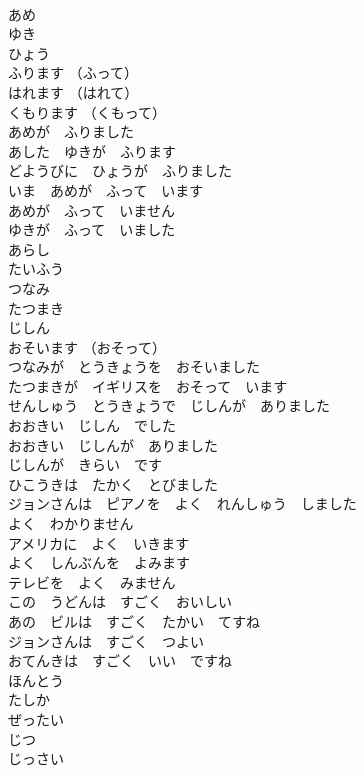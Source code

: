 \documentclass[8pt]{extreport}
\begin{document}
\begin{CJK}{UTF8}{min}
\\	あめ	
\\	ゆき	
\\	ひょう	
\\	ふります （ふって）	
\\	はれます （はれて）	
\\	くもります （くもって）	
\\	あめが　ふりました	
\\	あした　ゆきが　ふります	
\\	どようびに　ひょうが　ふりました	
\\	いま　あめが　ふって　います	
\\	あめが　ふって　いません	
\\	ゆきが　ふって　いました	
\\	あらし	
\\	たいふう	
\\	つなみ	
\\	たつまき	
\\	じしん	
\\	おそいます （おそって）	
\\	つなみが　とうきょうを　おそいました	
\\	たつまきが　イギリスを　おそって　います	
\\	せんしゅう　とうきょうで　じしんが　ありました	
\\	おおきい　じしん　でした	
\\	おおきい　じしんが　ありました	
\\	じしんが　きらい　です	
\\	ひこうきは　たかく　とびました	
\\	ジョンさんは　ピアノを　よく　れんしゅう　しました	
\\	よく　わかりません	
\\	アメリカに　よく　いきます	
\\	よく　しんぶんを　よみます	
\\	テレビを　よく　みません	
\\	この　うどんは　すごく　おいしい	
\\	あの　ビルは　すごく　たかい　てすね	
\\	ジョンさんは　すごく　つよい	
\\	おてんきは　すごく　いい　ですね	
\\	ほんとう	
\\	たしか	
\\	ぜったい	
\\	じつ	
\\	じっさい	

\end{CJK}
\end{document}
